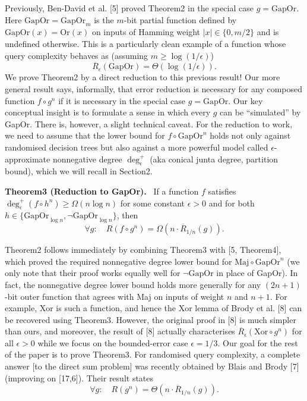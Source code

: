 \documentclass[10pt,a4paper]{article}
\newenvironment{authorclaim}[1]{\par\medskip\noindent\textbf{#1.}\ }{\par\medskip}
\begin{document}
Previously, Ben-David et al. [5] proved Theorem2 in the special case $g=\mathrm{GapOr}$. Here $\mathrm{GapOr}=\mathrm{GapOr}_m$ is the $m$-bit partial function defined by $\mathrm{GapOr}(x)=\mathrm{Or}(x)$ on inputs of Hamming weight $|x|\in\{0,m/2\}$ and is undefined otherwise. This is a particularly clean example of a function whose query complexity behaves as (assuming $m\ge\log(1/\epsilon)$)
\[\overline R_\epsilon(\mathrm{GapOr})=\Theta(\log(1/\epsilon)).\]
We prove Theorem2 by a direct reduction to this previous result! Our more general result says, informally, that error reduction is necessary for any composed function $f\circ g^n$ if it is necessary in the special case $g=\mathrm{GapOr}$. Our key conceptual insight is to formulate a sense in which every $g$ can be ``simulated'' by GapOr. There is, however, a slight technical caveat. For the reduction to work, we need to assume that the lower bound for $f\circ\mathrm{GapOr}^n$ holds not only against randomised decision trees but also against a more powerful model called $\epsilon$-approximate nonnegative degree $\deg^+_\epsilon$ (aka conical junta degree, partition bound), which we will recall in Section2.
\begin{authorclaim}{Theorem3 (Reduction to GapOr)}
If a function $f$ satisfies $\deg^+_\epsilon(f\circ h^n)\ge\Omega(n\log n)$ for some constant $\epsilon>0$ and for both $h\in\{\mathrm{GapOr}_{\log n},\neg\mathrm{GapOr}_{\log n}\}$, then
\[\forall g:\quad R(f\circ g^n)=\Omega(n\cdot\overline R_{1/n}(g)).\]
\end{authorclaim}
Theorem2 follows immediately by combining Theorem3 with [5, Theorem4], which proved the required nonnegative degree lower bound for $\mathrm{Maj}\circ\mathrm{GapOr}^n$ (we only note that their proof works equally well for $\neg\mathrm{GapOr}$ in place of GapOr). In fact, the nonnegative degree lower bound holds more generally for any $(2n+1)$-bit outer function that agrees with Maj on inputs of weight $n$ and $n+1$. For example, Xor is such a function, and hence the Xor lemma of Brody et al. [8] can be recovered using Theorem3. However, the original proof in [8] is much simpler than ours, and moreover, the result of [8] actually characterises $\overline R_\epsilon(\mathrm{Xor}\circ g^n)$ for all $\epsilon>0$ while we focus on the bounded-error case $\epsilon=1/3$.
Our goal for the rest of the paper is to prove Theorem3.
For randomised query complexity, a complete answer [to the direct sum problem] was recently obtained by Blais and Brody [7] (improving on [17,6]). Their result states
\[\forall g:\quad R(g^n)=\Theta(n\cdot\overline R_{1/n}(g)).\tag{Direct sum}\]
\end{document}
